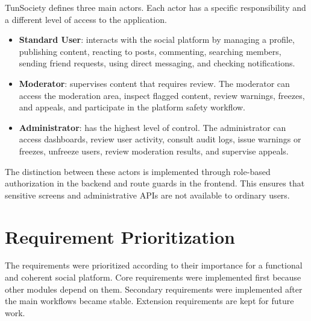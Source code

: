 TunSociety defines three main actors. Each actor has a specific responsibility and a different level of access to the application.

\begin{itemize}
    \item \textbf{Standard User}: interacts with the social platform by managing a profile, publishing content, reacting to posts, commenting, searching members, sending friend requests, using direct messaging, and checking notifications.
    \item \textbf{Moderator}: supervises content that requires review. The moderator can access the moderation area, inspect flagged content, review warnings, freezes, and appeals, and participate in the platform safety workflow.
    \item \textbf{Administrator}: has the highest level of control. The administrator can access dashboards, review user activity, consult audit logs, issue warnings or freezes, unfreeze users, review moderation results, and supervise appeals.
\end{itemize}

The distinction between these actors is implemented through role-based authorization in the backend and route guards in the frontend. This ensures that sensitive screens and administrative APIs are not available to ordinary users.

\section{Requirement Prioritization}

The requirements were prioritized according to their importance for a functional and coherent social platform. Core requirements were implemented first because other modules depend on them. Secondary requirements were implemented after the main workflows became stable. Extension requirements are kept for future work.

